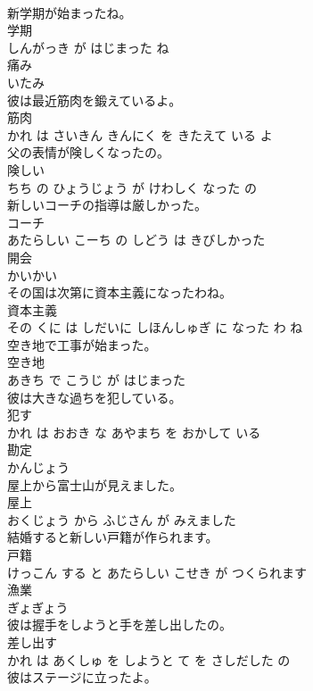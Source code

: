 \documentclass[8pt]{extreport}
\begin{document}
\begin{CJK}{UTF8}{min}
\\	新学期が始まったね。	
\\	学期 
\\	しんがっき が はじまった ね			
\\	痛み	
\\	いたみ			
\\	彼は最近筋肉を鍛えているよ。	
\\	筋肉 
\\	かれ は さいきん きんにく を きたえて いる よ			
\\	父の表情が険しくなったの。	
\\	険しい 
\\	ちち の ひょうじょう が けわしく なった の			
\\	新しいコーチの指導は厳しかった。	
\\	コーチ 
\\	あたらしい こーち の しどう は きびしかった			
\\	開会	
\\	かいかい			
\\	その国は次第に資本主義になったわね。	
\\	資本主義 
\\	その くに は しだいに しほんしゅぎ に なった わ ね			
\\	空き地で工事が始まった。	
\\	空き地 
\\	あきち で こうじ が はじまった			
\\	彼は大きな過ちを犯している。	
\\	犯す 
\\	かれ は おおき な あやまち を おかして いる			
\\	勘定	
\\	かんじょう			
\\	屋上から富士山が見えました。	
\\	屋上 
\\	おくじょう から ふじさん が みえました			
\\	結婚すると新しい戸籍が作られます。	
\\	戸籍 
\\	けっこん する と あたらしい こせき が つくられます			
\\	漁業	
\\	ぎょぎょう			
\\	彼は握手をしようと手を差し出したの。	
\\	差し出す 
\\	かれ は あくしゅ を しようと て を さしだした の			
\\	彼はステージに立ったよ。	

\end{CJK}
\end{document}

